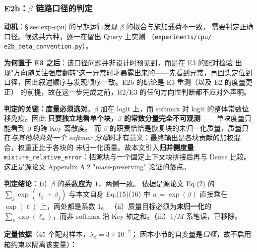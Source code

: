 \subsubsection{E2b：$\beta$ 链路口径的判定}

\textbf{动机}：\S\ref{sec:exp-cpu} 的早期运行发现 $\beta$ 的拟合与施加载荷不一致，
需要判定正确口径。候选共六种，逐一在留出 Query 上实测
（\texttt{experiments/}\allowbreak\texttt{cpu/}\allowbreak
\texttt{e2b\_beta\_}\allowbreak\texttt{convention.py}）。

\textbf{为何置于 E3 之后}：该口径问题并非设计时预见到，而是在 E3 的配对检验
出现"方向随关注强度翻转"这一异常时才暴露出来的——先看到异常，再回头定位到
口径，因此叙述顺序与发现顺序一致。E2b 的结论是 E3 重测（以及 E2 的度量更正）
的前提，故在这一步完成之前，E2/E3 的任何方向性判断都不应对外声明。

\textbf{判定的关键：度量必须选对}。$\beta$ 加在 logit 上，而
$\mathrm{softmax}$ 对 logit 的整体常数位移免疫。因此
\textbf{只要独立地看单个块，$\beta$ 的常数分量完全不可观测}——
单块度量只能看到 $\beta$ 的跨 Key 离散度。
而 $\beta$ 的职责恰恰是恢复块的未归一化质量，质量只在\emph{与其他块共处一个
softmax 分母}时才有意义：最终输出是各块贡献的加权混合，权重正比于各块的
未归一化质量。故本文引入\textbf{归并侧度量}
\texttt{mixture\_}\allowbreak\texttt{relative\_}\allowbreak\texttt{error}：把源块与一个固定上下文块拼接后再与 Dense 比较。
这正是源论文 Appendix A.2 "mass-preserving" 论证的落点。

\textbf{判定结论}：（i）$\beta$ 的系数\textbf{应为 $1$}，两侧一致。
依据是源论文 Eq.(2) 的 $\sum_j \exp(\ell_j+\beta_j)$ 与本文自身
Eq.(15)(16) 中 $w=\exp(\beta)$ 直接乘在 $\exp(\ell)$ 上，两处都是系数 $1$。
（ii）质量目标必须为\textbf{未归一化}的 $\sum_k \exp(\ell_k)$，而非
$\mathrm{softmax}$ 沿 Key 轴之和。（iii）$1/M$ 系笔误，已移除。

\textbf{定量依据}（$45$ 个配对样本，$\lambda_\beta=3\times10^{-2}$；
因本小节的自变量是\emph{口径}，故不启用箱约束以隔离该变量）：

